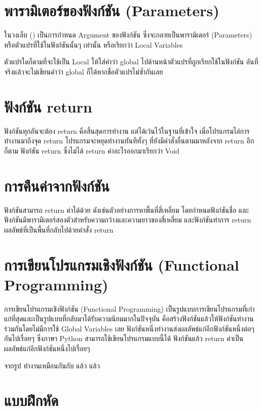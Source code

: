 \section{พารามิเตอร์ของฟังก์ชัน (Parameters)}

ในวงเล็บ () เป็นการกำหนด Argument ของฟังก์ชัน ซึ่งจะกลายเป็นพารามิเตอร์ (Parameters) หรือตัวแปรที่ใช้ในฟังก์ชันนั้นๆ เท่านั้น หรือเรียกว่า Local Variables 

ตัวแปรใดก็ตามที่จะใช้เป็น Local ให้ใส่คำว่า global ไปด้านหน้าตัวแปรที่ถูกเรียกใช้ในฟังก์ชัน อันที่จริงแล้วจะไม่เขียนคำว่า global ก็ได้หากชื่อตัวแปรไม่ซ้ำกันเลย


\section{ฟังก์ชัน return}

ฟังก์ชันทุกอันจะต้อง return คือสิ้นสุดการทำงาน แต่ได้เว้นไว้ในฐานที่เข้าใจ เมื่อโปรแกรมไล่การทำงานมาถึงจุด return โปรแกรมจะหยุดทำงานทันทีทั้งๆ ที่ยังมีคำสั่งอื่นตามมาหลังจาก return อีกก็ตาม  ฟังก์ชัน return ซึ่งไม่ได้ return ค่าอะไรออกมาเรียกว่า Void 

\section{การคืนค่าจากฟังก์ชัน}

ฟังก์ชันสามารถ return ค่าได้ด้วย ดังเช่นตัวอย่างการหาพื้นที่สี่เหลี่ยม โดยกำหนดฟังก์ชันชื่อ   และฟังก์ชันมีพารามิเตอร์สองตัวสำหรับความกว้างและความยาวของสี่เหลี่ยม และฟังก์ชันทำการ return ผลลัพธ์ที่เป็นพื้นที่กลับไปด้วยคำสั่ง return


\section{การเขียนโปรแกรมเชิงฟังก์ชัน (Functional Programming)}


การเขียนโปรแกรมเชิงฟังก์ชัน (Functional Programming) เป็นรูปแบบการเขียนโปรแกรมที่เก่าแก่ที่สุดและเป็นรูปแบบที่กลับมาได้รับความนิยมมากในปัจจุบัน คือสร้างฟังก์ชันแล้วให้ฟังก์ชันทำงานร่วมกันโดยไม่มีการใช้ Global Variables เลย ฟังก์ชันหนึ่งทำงานส่งผลลัพธ์แก่อีกฟังก์ชันหนึ่งต่อๆ กันไปเรื่อยๆ ซึ่งภาษา Python สามารถใช้เขียนโปรแกรมแบบนี้ได้ ฟังก์ชันแล้ว return ค่าเป็นผลลัพธ์แก่อีกฟังก์ชันหนึ่งไปเรื่อยๆ  

จากรูป   ทำงานเหมือนกันกับ  แล้ว   แล้ว  


\section{แบบฝึกหัด}

